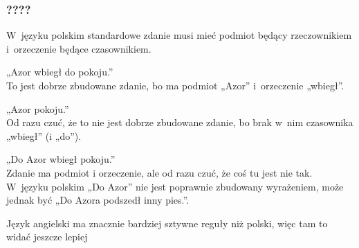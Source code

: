 \documentclass[10pt,t]{beamer}
\begin{document}
\begin{frame}
  \frametitle{????}







  W~języku polskim standardowe zdanie musi mieć podmiot będący rzeczownikiem
  i~orzeczenie będące czasownikiem.

  „Azor wbiegł do pokoju.” \\
  To jest dobrze zbudowane zdanie, bo ma podmiot „Azor” i~orzeczenie
  „wbiegł”.

  „Azor pokoju.” \\
  Od razu czuć, że to nie jest dobrze zbudowane zdanie, bo brak w~nim
  czasownika „wbiegł” (i „do”).

  „Do Azor wbiegł pokoju.” \\
  Zdanie ma podmiot i orzeczenie, ale od razu czuć, że coś tu jest nie tak.
  W~języku polskim „Do Azor” nie jest poprawnie zbudowany wyrażeniem,
  może jednak być „Do Azora podszedł inny pies.”.

  Język angielski ma znacznie bardziej sztywne reguły niż polski, więc
  tam to widać jeszcze lepiej




\end{frame}
\end{document}
